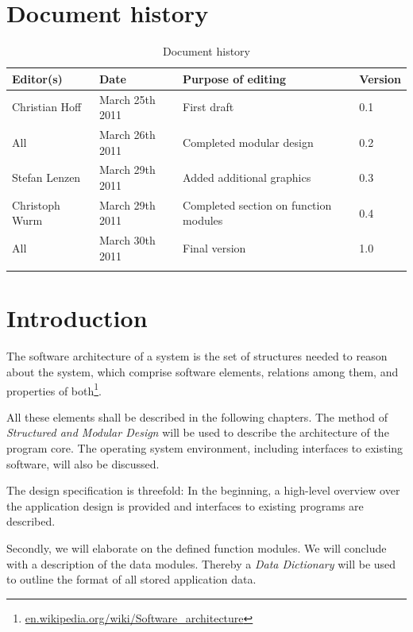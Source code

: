 


\maketitle
\newpage
\tableofcontents
\newpage
\listoftables
\newpage

\setcounter{page}{4}

\chapter{Document history}
\begin{longtable}[c]{|p{}|p{}|p{}|p{}|}
\hline
Editor(s) & Date & Purpose of editing & Version\\
\hline
\hline
Christian Hoff & March 25th 2011 & First draft & 0.1 \\
All & March 26th 2011 & Completed modular design & 0.2 \\
Stefan Lenzen & March 29th 2011 & Added additional graphics & 0.3 \\
Christoph Wurm & March 29th 2011 & Completed section on function modules & 0.4 \\
All & March 30th 2011 & Final version & 1.0 \\
\hline
\caption{Document history}
\end{longtable}
\newpage
\chapter{Introduction}
The software architecture of a system is the set of structures needed to reason about the system, which comprise software elements, relations among them, and properties of both\footnote{\href{en.wikipedia.org/wiki/Software_architecture}{en.wikipedia.org/wiki/Software\_architecture}}.

All these elements shall be described in the following chapters. The method of \emph{Structured and Modular Design} will be used to describe the architecture of the program core. The operating system environment, including interfaces to existing software, will also be discussed.

The design specification is threefold: In the beginning, a high-level overview over the application design is provided and interfaces to existing programs are described.

Secondly, we will elaborate on the defined function modules. We will conclude with a description of the data modules. Thereby a \emph{Data Dictionary} will be used to outline the format of all stored application data.
\newpage
